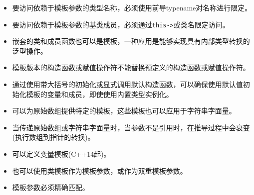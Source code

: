 
\begin{itemize}
\item 
要访问依赖于模板参数的类型名称，必须使用前导typename对名称进行限定。

\item 
要访问依赖于模板参数的基类成员，必须通过\texttt{this->}或类名限定访问。

\item 
嵌套的类和成员函数也可以是模板，一种应用是能够实现具有内部类型转换的泛型操作。

\item 
模板版本的构造函数或赋值操作符不能替换预定义的构造函数或赋值操作符。

\item 
通过使用带大括号的初始化或显式调用默认构造函数，可以确保使用默认值初始化模板的变量和成员，即使使用内置类型实例化。

\item 
可以为原始数组提供特定的模板，这些模板也可以应用于字符串字面量。

\item 
当传递原始数组或字符串字面量时，当参数不是引用时，在推导过程中会衰变(执行数组到指针的转换)。

\item 
可以定义变量模板(C++14起)。

\item 
也可以使用类模板作为模板参数，或作为双重模板参数。

\item 
模板参数必须精确匹配。
\end{itemize}